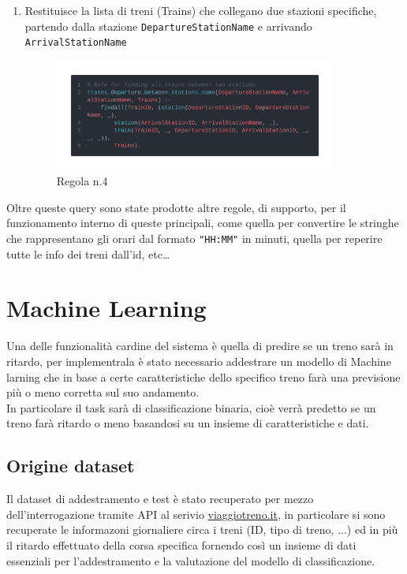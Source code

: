 \documentclass[italian,12pt,a4paper]{article}
\begin{document}
\begin{enumerate}
\begin{figure}[h]
			\end{figure}
		\item Restituisce la lista di treni (Trains) che collegano due stazioni specifiche, partendo dalla stazione \texttt{DepartureStationName} e arrivando \texttt{ArrivalStationName}
			\begin{figure}[h]
				\centering
				\includegraphics[width=350px]{img/code3}
				\caption{Regola n.4}

			\end{figure}

				
	\end{enumerate}
	
	
	Oltre queste query sono state prodotte altre regole, di supporto, per il funzionamento interno di queste principali, come quella per convertire le stringhe che rappresentano gli orari dal formato \texttt{"HH:MM"} in minuti, quella per reperire tutte le info dei treni dall'id, etc\dots

	\section{Machine Learning}
		Una delle funzionalità cardine del sistema è quella di predire se un treno sarà in ritardo, per implementrala è stato necessario addestrare un modello di Machine larning che in base a certe caratteristiche dello specifico treno farà una previsione più o meno corretta sul suo andamento. \\
		\linebreak
		In particolare il task sarà di classificazione binaria, cioè verrà predetto se un treno farà ritardo o meno basandosi su un insieme di caratteristiche e dati.
	
	\subsection{Origine dataset}
		Il dataset di addestramento e test è stato recuperato per mezzo dell'interrogazione tramite API al serivio 	\href{http://www.viaggiatreno.it/infomobilita/index.jsp}{viaggiotreno.it}, in particolare si sono recuperate le informazoni giornaliere circa i treni (ID, tipo di treno, ...) ed in più il ritardo effettuato della corsa specifica fornendo così un insieme di dati essenziali per l'addestramento e la valutazione del modello di classificazione.
		
\end{document}
